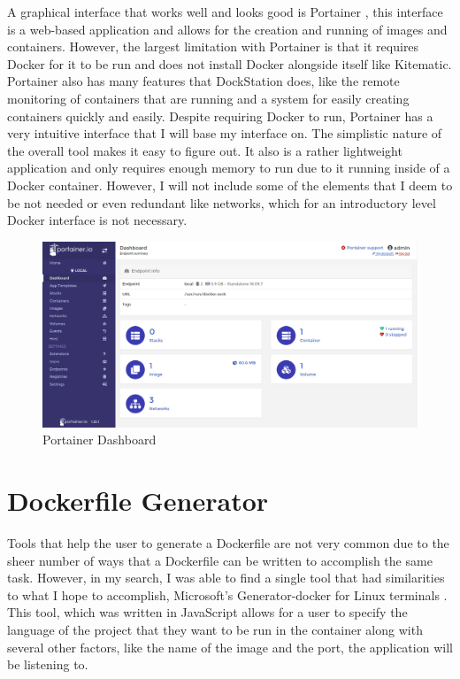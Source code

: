 A graphical interface that works well and looks good is Portainer \cite{portainer}, this interface is a web-based application and allows for the creation and running of images and containers. However, the largest limitation with Portainer is that it requires Docker for it to be run and does not install Docker alongside itself like Kitematic. Portainer also has many features that DockStation does, like the remote monitoring of containers that are running and a system for easily creating containers quickly and easily. Despite requiring Docker to run, Portainer has a very intuitive interface that I will base my interface on. The simplistic nature of the overall tool makes it easy to figure out. It also is a rather lightweight application and only requires enough memory to run due to it running inside of a Docker container. However, I will not include some of the elements that I deem to be not needed or even redundant like networks, which for an introductory level Docker interface is not necessary.

\begin{figure}[h!]
    \centering
    \includegraphics[width=5in]{images/Portainer}
    \caption{Portainer Dashboard}
\end{figure}

\section{Dockerfile Generator}
\label{sec:generator}

Tools that help the user to generate a Dockerfile are not very common due to the sheer number of ways that a Dockerfile can be written to accomplish the same task. However, in my search, I was able to find a single tool that had similarities to what I hope to accomplish, Microsoft's Generator-docker for Linux terminals \cite{microsoft_2018}. This tool, which was written in JavaScript allows for a user to specify the language of the project that they want to be run in the container along with several other factors, like the name of the image and the port, the application will be listening to.

